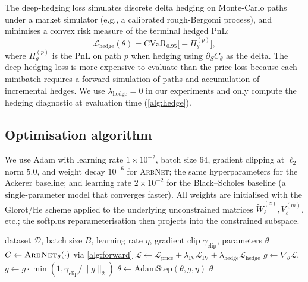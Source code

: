 \documentclass[largeformat]{interact}
\let\cite\citep   %
\theoremstyle{plain}
\theoremstyle{definition}
\newcommand{\arbnet}{\textsc{ArbNet}}
\newcommand{\bs}{Black--Scholes}
\begin{document}
The deep-hedging loss \cite{buehler2019deep,chakrabarti2019deep,imaki2021no} simulates discrete delta hedging on Monte-Carlo paths under a market simulator (e.g., a calibrated rough-Bergomi process), and minimises a convex risk measure of the terminal hedged PnL:
\begin{equation}
\label{eq:hedge-loss}
\mathcal{L}_{\mathrm{hedge}}(\theta) = \mathrm{CVaR}_{0.95}\bigl[ -\Pi^{(p)}_\theta \bigr],
\end{equation}
where $\Pi^{(p)}_\theta$ is the PnL on path $p$ when hedging using $\partial_S C_\theta$ as the delta. The deep-hedging loss is more expensive to evaluate than the price loss because each minibatch requires a forward simulation of paths and accumulation of incremental hedges. We use $\lambda_{\mathrm{hedge}} = 0$ in our experiments and only compute the hedging diagnostic at evaluation time (\cref{alg:hedge}).

\subsection{Optimisation algorithm}
\label{sec:opt-algorithm}

We use Adam \cite{kingma2014adam,kingma2015adam} with learning rate $1\times10^{-2}$, batch size $64$, gradient clipping at $\ell_2$ norm $5.0$, and weight decay $10^{-6}$ for \arbnet{}; the same hyperparameters for the Ackerer baseline; and learning rate $2\times10^{-2}$ for the \bs{} baseline (a single-parameter model that converges faster). All weights are initialised with the Glorot/He scheme \cite{he2015delving} applied to the underlying unconstrained matrices $\widetilde W^{(z)}_\ell, V^{(m)}_\ell$, etc.; the softplus reparameterisation then projects into the constrained subspace.

\begin{algorithm}[t]
\caption{One epoch of \arbnet{} training}
\label{alg:train}
\begin{algorithmic}[1]
\Require dataset $\mathcal{D}$, batch size $B$, learning rate $\eta$, gradient clip $\gamma_{\mathrm{clip}}$, parameters $\theta$
  \State $C \gets \arbnet_\theta(\cdot)$ via \cref{alg:forward}
  \State $\mathcal{L} \gets \mathcal{L}_{\mathrm{price}} + \lambda_{\mathrm{IV}}\mathcal{L}_{\mathrm{IV}} + \lambda_{\mathrm{hedge}}\mathcal{L}_{\mathrm{hedge}}$
  \State $g \gets \nabla_\theta \mathcal{L}$, $g \gets g \cdot \min(1, \gamma_{\mathrm{clip}}/\|g\|_2)$
  \State $\theta \gets \mathrm{AdamStep}(\theta, g, \eta)$
\EndFor
\State \Return $\theta$
\end{algorithmic}
\end{algorithm}
\end{document}
